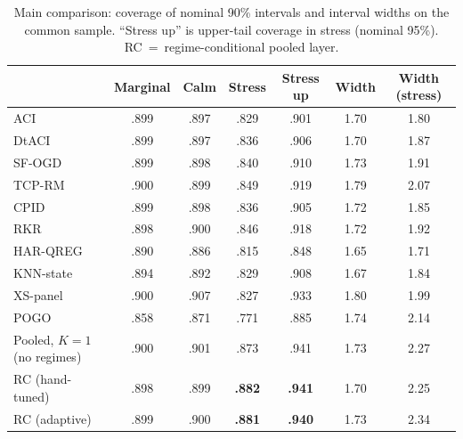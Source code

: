 \begin{table}[t]
\centering
\caption{Main comparison: coverage of nominal 90\% intervals and
interval widths on the common sample. ``Stress up'' is upper-tail coverage
in stress (nominal 95\%). RC~=~regime-conditional pooled layer.}
\label{tab:main}
\small
\begin{tabular}{lcccccc}
\toprule
 & Marginal & Calm & Stress & Stress up & Width & Width (stress) \\
\midrule
ACI & .899 & .897 & .829 & .901 & 1.70 & 1.80 \\
DtACI & .899 & .897 & .836 & .906 & 1.70 & 1.87 \\
SF-OGD & .899 & .898 & .840 & .910 & 1.73 & 1.91 \\
TCP-RM & .900 & .899 & .849 & .919 & 1.79 & 2.07 \\
CPID & .899 & .898 & .836 & .905 & 1.72 & 1.85 \\
RKR & .898 & .900 & .846 & .918 & 1.72 & 1.92 \\
HAR-QREG & .890 & .886 & .815 & .848 & 1.65 & 1.71 \\
KNN-state & .894 & .892 & .829 & .908 & 1.67 & 1.84 \\
XS-panel & .900 & .907 & .827 & .933 & 1.80 & 1.99 \\
POGO & .858 & .871 & .771 & .885 & 1.74 & 2.14 \\
Pooled, $K=1$ (no regimes) & .900 & .901 & .873 & .941 & 1.73 & 2.27 \\
RC (hand-tuned) & .898 & .899 & \textbf{.882} & \textbf{.941} & 1.70 & 2.25 \\
RC (adaptive) & .899 & .900 & \textbf{.881} & \textbf{.940} & 1.73 & 2.34 \\
\bottomrule
\end{tabular}
\end{table}

